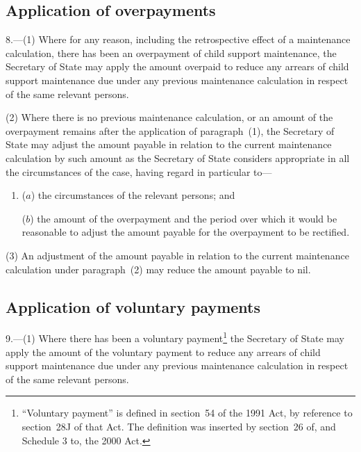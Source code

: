 \documentclass[12pt,a4paper]{article}
\begin{document}
\renewcommand\parthead{--- Part III}

\subsection[8. Application of overpayments]{Application of overpayments}

8.---(1)  Where for any reason, including the retrospective effect of a maintenance calculation, there has been an overpayment of child support maintenance, the 
Secretary of State  %
may apply the amount overpaid to reduce any arrears of child support maintenance due under any previous maintenance calculation in respect of the same relevant persons.

(2) Where there is no previous maintenance calculation, or an amount of the overpayment remains after the application of paragraph~(1), the 
Secretary of State  %
may adjust the amount payable in relation to the current maintenance calculation by such amount as 
the Secretary of State  %
considers appropriate in all the circumstances of the case, having regard in particular to—
\begin{enumerate}\item[]
($a$) the circumstances of the relevant persons; and

($b$) the amount of the overpayment and the period over which it would be reasonable to adjust the amount payable for the overpayment to be rectified.
\end{enumerate}

(3) An adjustment of the amount payable in relation to the current maintenance calculation under paragraph~(2) may reduce the amount payable to nil.


\subsection[9. Application of voluntary payments]{Application of voluntary payments}

9.---(1)  Where there has been a voluntary payment\footnote{“Voluntary payment” is defined in section~54 of the 1991 Act, by reference to section~28J of that Act. The definition was inserted by section~26 of, and Schedule 3 to, the 2000 Act.} the 
Secretary of State  %
may apply the amount of the voluntary payment to reduce any arrears of child support maintenance due under any previous maintenance calculation in respect of the same relevant persons.
\end{document}
